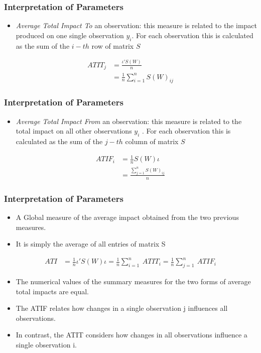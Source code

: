 \documentclass[
  shownotes,
  xcolor={svgnames},
  hyperref={colorlinks,citecolor=DarkBlue,linkcolor=DarkRed,urlcolor=DarkBlue}
  , aspectratio=169]{beamer}
\begin{document}
\begin{frame}
\frametitle{Interpretation of Parameters}

\begin{itemize}
\item {\it Average Total Impact To} an observation: this measure is related to the impact produced on one single observation $y_i$. For each observation this is calculated as the sum of the $i-th$ row of matrix $S$
\end{itemize}

\begin{align}
ATIT_j &= \frac{\iota'S(W)}{n} \nonumber \\
&= \frac{1}{n}\sum_{i=1}^n S(W)_{ij}
\end{align}


\end{frame}
\begin{frame}
\frametitle{Interpretation of Parameters}

\begin{itemize}
\item {\it Average Total Impact From} an observation: this measure is related to the total impact on all other observations $y_i$ . For each observation this is calculated as the sum of the $j-th$ column of matrix $S$
\end{itemize}

\begin{align}
ATIF_i &= \frac{1}{n}S(W)\iota \nonumber \\
&= \frac{\sum_{j=1}^n S(W)_{ij}}{n} 
\end{align}


\end{frame}
\begin{frame}
\frametitle{Interpretation of Parameters}

\begin{itemize}
\item A Global measure of the average impact obtained from the two previous measures. 
\item It is simply the average of all entries of matrix S
\end{itemize}

\begin{align}
ATI &= \frac{1}{n}\iota'S(W) \iota = \frac{1}{n}\sum_{i=1}^n\ ATIT_i = \frac{1}{n}\sum_{j=1}^n\ ATIF_i
\end{align}

\begin{itemize}
  \item The numerical values of the summary measures for the two forms of average total impacts are equal.
  \item The ATIF relates how changes in a single observation j influences all observations.
  \item In contrast, the ATIT considers how changes in all observations influence a single observation i.
\end{itemize}


\end{frame}
\end{document}
